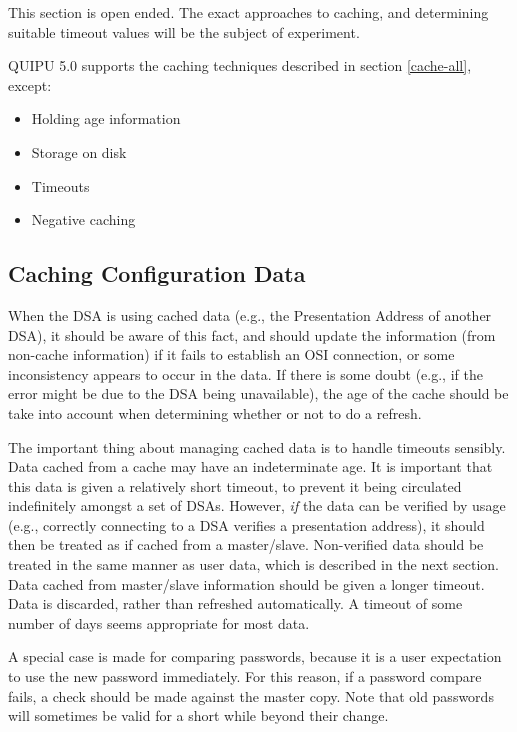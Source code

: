 This section is open ended.
The exact approaches to caching, and determining suitable timeout values
will be the subject of experiment.

QUIPU 5.0 supports the caching techniques described in section
\ref{cache-all}, except:

\begin {itemize}
\item Holding age information
\item Storage on disk
\item Timeouts 
\item Negative caching
\end {itemize}


\subsection {Caching Configuration Data}


When the DSA is using cached data (e.g., the Presentation Address of another
DSA), it should be aware of this fact, and should update the information
(from non-cache information) if it fails to establish an OSI connection,
or some inconsistency appears to occur in the data.  If there is some doubt
(e.g., if the error might be due to the DSA being unavailable), the age of
the cache should be take into account when determining whether or not to do
a refresh.

The important thing about managing cached data is to handle timeouts
sensibly.
Data cached from a cache may have an indeterminate age.
It is important that this data is given a relatively short timeout, to
prevent it being circulated indefinitely amongst a set of DSAs.
However, {\em if} the data can be verified by usage (e.g., correctly 
connecting to a DSA verifies a presentation address), it should then be
treated as if cached from a master/slave.  
Non-verified data should be treated in the same manner as user data, which
is described in the next section.
Data cached from master/slave information should be given a longer timeout.
Data is discarded, rather than refreshed automatically.  A timeout of some
number of days seems appropriate for most data.   

A special case is made for comparing passwords, because it is a user
expectation to use the new password immediately.  For this reason, if a
password compare fails, a check should be made against the master copy.
Note that old passwords will sometimes be valid for a
short while beyond their change.  

